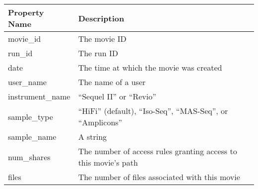\begin{tabular}{p{4cm}p{6cm}}
\toprule
 Property Name   & Description                                                     \\
\midrule
 movie\_id        & The movie ID                                                    \\
 run\_id          & The run ID                                                      \\
 date            & The time at which the movie was created                         \\
 user\_name       & The name of a user                                              \\
 instrument\_name & ``Sequel II'' or ``Revio''                                      \\
 sample\_type     & ``HiFi'' (default), ``Iso-Seq'', ``MAS-Seq'', or ``Amplicons''  \\
 sample\_name     & A string                                                        \\
 num\_shares      & The number of access rules granting access to this movie's path \\
 files           & The number of files associated with this movie                  \\
\bottomrule
\end{tabular}